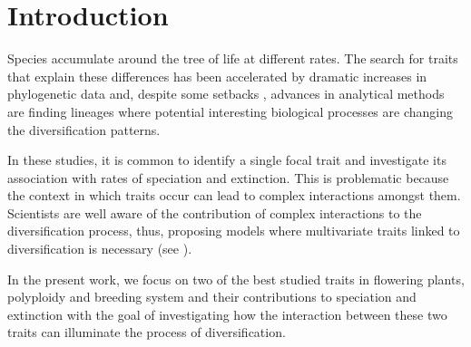 \section{Introduction}

Species accumulate around the tree of life at different rates.
The search for traits that explain these differences has been accelerated by dramatic increases in phylogenetic data and, despite some setbacks \citep{maddison_2015, rabosky_2015, moore_2016}, advances in analytical methods \citep{maddison_2007, fitzjohn_2009, goldberg_2012, beaulieu_2016, rabosky_2017} are finding lineages where potential interesting biological processes are changing the  diversification patterns. %

In these studies, it is common to identify a single focal trait and investigate its association with rates of speciation and extinction. This is problematic because the context in which traits occur can lead to complex interactions amongst them. Scientists are well aware of the contribution of complex interactions to the diversification process, thus, proposing models where multivariate traits linked to diversification is necessary (see \citet{caetano_2018, herrera_2018}). %

In the present work,  we focus on two of the best studied traits in flowering plants, polyploidy and breeding system and their contributions to speciation and extinction with the goal of investigating how the interaction between these two traits can illuminate the process of diversification. %

